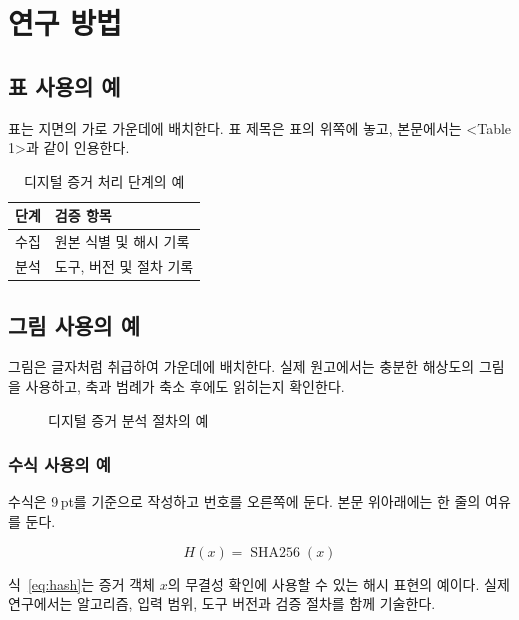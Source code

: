 \section{연구 방법}

\subsection{표 사용의 예}

표는 지면의 가로 가운데에 배치한다. 표 제목은 표의 위쪽에 놓고, 본문에서는 \textless Table 1\textgreater 과 같이 인용한다.

\begin{table}[htbp]
  \centering
  \caption{디지털 증거 처리 단계의 예}
  \label{tab:evidence-process}
  \renewcommand{\arraystretch}{1.15}
  \begin{tabular}{|>{\centering\arraybackslash}p{50mm}|>{\centering\arraybackslash}p{60mm}|}
    \hline
    \rowcolor{black!15}\textbf{단계} & \textbf{검증 항목} \\
    \hline
    수집 & 원본 식별 및 해시 기록 \\
    \hline
    분석 & 도구, 버전 및 절차 기록 \\
    \hline
  \end{tabular}
\end{table}

\subsection{그림 사용의 예}

그림은 글자처럼 취급하여 가운데에 배치한다. 실제 원고에서는 충분한 해상도의 그림을 사용하고, 축과 범례가 축소 후에도 읽히는지 확인한다.

\begin{figure}[htbp]
  \centering
  \caption{디지털 증거 분석 절차의 예}
  \label{fig:workflow}
\end{figure}

\subsubsection{수식 사용의 예}

수식은 9\,pt를 기준으로 작성하고 번호를 오른쪽에 둔다. 본문 위아래에는 한 줄의 여유를 둔다.

\begin{equation}
  H(x)=\operatorname{SHA256}(x)
  \label{eq:hash}
\end{equation}

식~\eqref{eq:hash}는 증거 객체 $x$의 무결성 확인에 사용할 수 있는 해시 표현의 예이다. 실제 연구에서는 알고리즘, 입력 범위, 도구 버전과 검증 절차를 함께 기술한다\cite{nist80086}.
